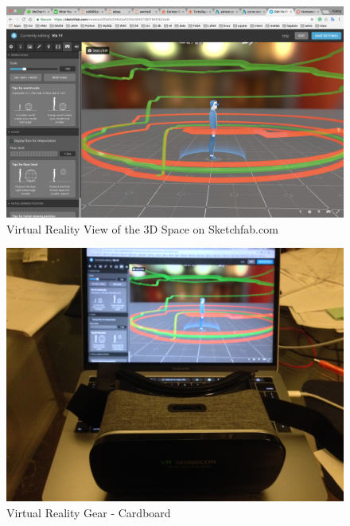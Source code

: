 \documentclass[12pt]{article}
\begin{document}
\begin{itemize}
\begin{figure}[h]
\centering
\includegraphics[width=.8\linewidth]{3.png}
\caption{Virtual Reality View of the 3D Space on Sketchfab.com}
\label{fig:name}
\end{figure}
\begin{figure}[h]
\centering
\includegraphics[width=.8\linewidth]{4.jpg}
\caption{Virtual Reality Gear - Cardboard}
\label{fig:name}
\end{figure}
\end{itemize}
\end{document}
